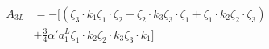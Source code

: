 \begin{equation}\begin{split}
A_{3L} &= -\Big[(\zeta_3\cdot k_1 \zeta_1 \cdot \zeta_2 + \zeta_2\cdot k_3 \zeta_3 \cdot \zeta_1+\zeta_1\cdot k_2 \zeta_2 \cdot \zeta_3)
\\&+ \frac34\alpha'a_1^L\zeta_1\cdot k_2 \zeta_2\cdot k_3 \zeta_3 \cdot k_1\Big]
\end{split}\end{equation}

